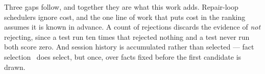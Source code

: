 Three gaps follow, and together they are what this work adds. Repair-loop
schedulers ignore cost, and the one line of work that puts cost in the
ranking~\citep{elbaum2001cost} assumes it is known in advance. A count of
rejections discards the evidence of \emph{not} rejecting, since a test run ten
times that rejected nothing and a test never run both score zero. And session
history is accumulated rather than selected --- fact
selection~\citep{parasaram2025factselection} does select, but once, over facts
fixed before the first candidate is drawn.
